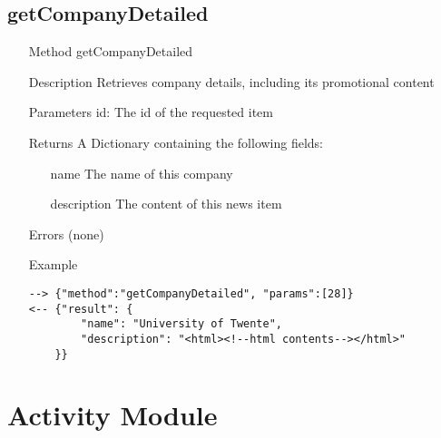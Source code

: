 \documentclass[a4paper]{scrreprt}
\begin{document}
\subsection{getCompanyDetailed}
\begin{enumerate}
\item[Method] getCompanyDetailed
\item[Description] Retrieves company details, including its promotional content
\item[Parameters] 
    id: The id of the requested item
\item[Returns] A Dictionary containing the following fields:
\begin{enumerate}
    \item[name] The name of this company
    \item[description] The content of this news item
	\end{enumerate}
\item[Errors] (none)
\item[Example]
\begin{lstlisting}
--> {"method":"getCompanyDetailed", "params":[28]}
<-- {"result": {
        "name": "University of Twente", 
        "description": "<html><!--html contents--></html>"
    }}
\end{lstlisting}
\end{enumerate}


\section{Activity Module}
\end{document}
